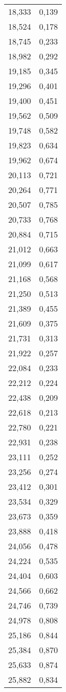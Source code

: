 \begin{longtable}{c c}
	18,333&0,139 \\
	18,524&0,178 \\
	18,745&0,233 \\
	18,982&0,292 \\
	19,185&0,345 \\
	19,296&0,401 \\
	19,400&0,451 \\
	19,562&0,509 \\
	19,748&0,582 \\
	19,823&0,634 \\
	19,962&0,674 \\
	20,113&0,721 \\
	20,264&0,771 \\
	20,507&0,785 \\
	20,733&0,768 \\
	20,884&0,715 \\
	21,012&0,663 \\
	21,099&0,617 \\
	21,168&0,568 \\
	21,250&0,513 \\
	21,389&0,455 \\
	21,609&0,375 \\
	21,731&0,313 \\
	21,922&0,257 \\
	22,084&0,233 \\
	22,212&0,224 \\
	22,438&0,209 \\
	22,618&0,213 \\
	22,780&0,221 \\
	22,931&0,238 \\
	23,111&0,252 \\
	23,256&0,274 \\
	23,412&0,301 \\
	23,534&0,329 \\
	23,673&0,359 \\
	23,888&0,418 \\
	24,056&0,478 \\
	24,224&0,535 \\
	24,404&0,603 \\
	24,566&0,662 \\
	24,746&0,739 \\
	24,978&0,808 \\
	25,186&0,844 \\
	25,384&0,870 \\
	25,633&0,874 \\
	25,882&0,834 \\

\end{longtable}
